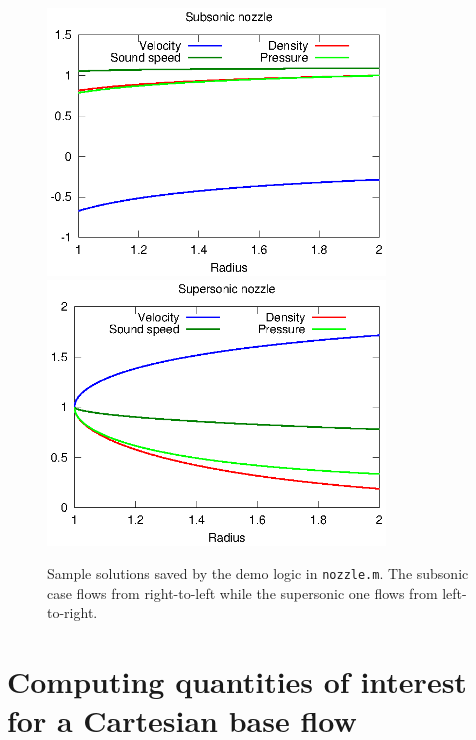 \documentclass[letterpaper,11pt,nointlimits,reqno]{amsart}
\begin{document}
\begin{figure}[p]
  \centering
  \includegraphics[width=0.80\textwidth]{nozzle_subsonic}
  \vfill
  \includegraphics[width=0.80\textwidth]{nozzle_supersonic}
  \caption{
      \label{fig:sample_solns}
      Sample solutions saved by the demo logic in \texttt{nozzle.m}.  The
      subsonic case flows from right-to-left while the supersonic one flows
      from left-to-right.
  }
\end{figure}

\clearpage

\section{Computing quantities of interest for a Cartesian base flow}
\end{document}
